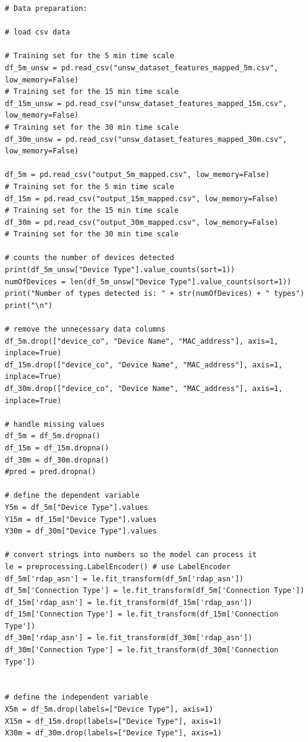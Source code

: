 \documentclass{article}
\begin{document}
\begin{appendices}
\begin{verbatim}
# Data preparation:

# load csv data

# Training set for the 5 min time scale
df_5m_unsw = pd.read_csv("unsw_dataset_features_mapped_5m.csv", 
low_memory=False)
# Training set for the 15 min time scale
df_15m_unsw = pd.read_csv("unsw_dataset_features_mapped_15m.csv", 
low_memory=False)
# Training set for the 30 min time scale
df_30m_unsw = pd.read_csv("unsw_dataset_features_mapped_30m.csv", 
low_memory=False) 

df_5m = pd.read_csv("output_5m_mapped.csv", low_memory=False) 
# Training set for the 5 min time scale
df_15m = pd.read_csv("output_15m_mapped.csv", low_memory=False) 
# Training set for the 15 min time scale
df_30m = pd.read_csv("output_30m_mapped.csv", low_memory=False) 
# Training set for the 30 min time scale

# counts the number of devices detected
print(df_5m_unsw["Device Type"].value_counts(sort=1))
numOfDevices = len(df_5m_unsw["Device Type"].value_counts(sort=1))
print("Number of types detected is: " + str(numOfDevices) + " types")
print("\n")

# remove the unnecessary data columns 
df_5m.drop(["device_co", "Device Name", "MAC_address"], axis=1, 
inplace=True)
df_15m.drop(["device_co", "Device Name", "MAC_address"], axis=1, 
inplace=True)
df_30m.drop(["device_co", "Device Name", "MAC_address"], axis=1, 
inplace=True)

# handle missing values
df_5m = df_5m.dropna()
df_15m = df_15m.dropna()
df_30m = df_30m.dropna()
#pred = pred.dropna()

# define the dependent variable
Y5m = df_5m["Device Type"].values
Y15m = df_15m["Device Type"].values
Y30m = df_30m["Device Type"].values

# convert strings into numbers so the model can process it
le = preprocessing.LabelEncoder() # use LabelEncoder
df_5m['rdap_asn'] = le.fit_transform(df_5m['rdap_asn'])
df_5m['Connection Type'] = le.fit_transform(df_5m['Connection Type'])
df_15m['rdap_asn'] = le.fit_transform(df_15m['rdap_asn'])
df_15m['Connection Type'] = le.fit_transform(df_15m['Connection Type'])
df_30m['rdap_asn'] = le.fit_transform(df_30m['rdap_asn'])
df_30m['Connection Type'] = le.fit_transform(df_30m['Connection Type'])


# define the independent variable
X5m = df_5m.drop(labels=["Device Type"], axis=1)
X15m = df_15m.drop(labels=["Device Type"], axis=1)
X30m = df_30m.drop(labels=["Device Type"], axis=1)



\end{verbatim}
\end{appendices}
\end{document}
